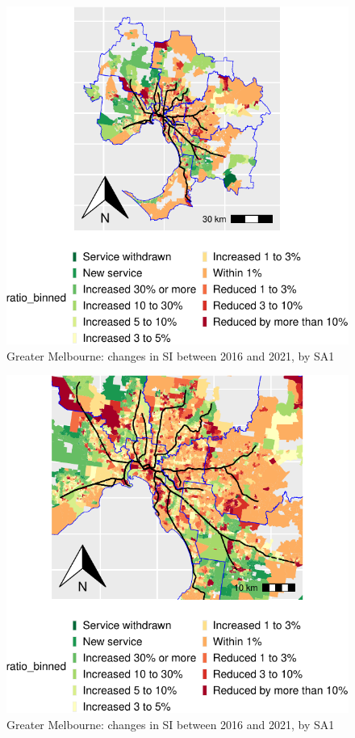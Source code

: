 \documentclass[preprint, 3p,
authoryear]{elsarticle} %
\begin{document}
\begin{figure}
\includegraphics[width=0.9\linewidth]{Leveraging_GTFS_to_assess_transit_supply_Transport_Geography_files/figure-latex/Greater_Melbourne_2016_2021_ratio_map-1} \caption{Greater Melbourne: changes in SI between 2016 and 2021, by SA1}\label{fig:Greater_Melbourne_2016_2021_ratio_map}
\end{figure}

\begin{figure}
\includegraphics[width=0.9\linewidth]{Leveraging_GTFS_to_assess_transit_supply_Transport_Geography_files/figure-latex/Greater_Melbourne_2016_2021_ratio_map_suburban_railway_extents-1} \caption{Greater Melbourne: changes in SI between 2016 and 2021, by SA1}\label{fig:Greater_Melbourne_2016_2021_ratio_map_suburban_railway_extents}
\end{figure}
\end{document}
